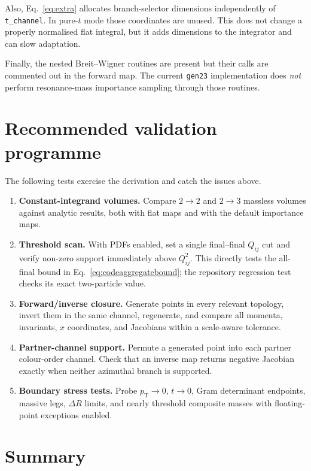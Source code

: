 \documentclass[11pt,a4paper]{article}
\newcommand{\code}[1]{\texttt{#1}}
\newcommand{\pt}{p_{\mathrm{T}}}
\begin{document}
Also, Eq.~\eqref{eq:extra} allocates branch-selector dimensions independently
of \code{t\_channel}.  In pure-$t$ mode those coordinates are unused.  This
does not change a properly normalised flat integral, but it adds dimensions to
the integrator and can slow adaptation.

Finally, the nested Breit--Wigner routines are present but their calls are
commented out in the forward map.  The current \code{gen23} implementation
does \emph{not} perform resonance-mass importance sampling through those
routines.

\section{Recommended validation programme}

The following tests exercise the derivation and catch the issues above.

\begin{enumerate}
\item \textbf{Constant-integrand volumes.}  Compare $2\to2$ and $2\to3$
  massless volumes against analytic results, both with flat maps and with the
  default importance maps.
\item \textbf{Threshold scan.}  With PDFs enabled, set a single final--final
  $Q_{ij}$ cut and verify non-zero support immediately above $Q_{ij}^2$.
  This directly tests the all-final bound in Eq.~\eqref{eq:codeaggregatebound};
  the repository regression test checks its exact two-particle value.
\item \textbf{Forward/inverse closure.}  Generate points in every relevant
  topology, invert them in the same channel, regenerate, and compare all
  momenta, invariants, $x$ coordinates, and Jacobians within a scale-aware
  tolerance.
\item \textbf{Partner-channel support.}  Permute a generated point into each
  partner colour-order channel.  Check that an inverse map returns negative
  Jacobian exactly when neither azimuthal branch is supported.
\item \textbf{Boundary stress tests.}  Probe $\pt\to0$, $t\to0$, Gram
  determinant endpoints, massive legs, $\Delta R$ limits, and nearly
  threshold composite masses with floating-point exceptions enabled.
\end{enumerate}

\section{Summary}
\end{document}

